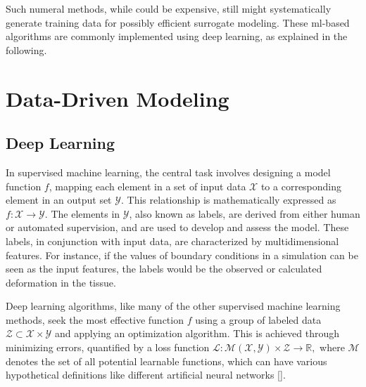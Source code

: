 Such numeral methods, while could be expensive, still might systematically generate training data for possibly efficient surrogate modeling. These \ac{ml}-based algorithms are commonly implemented using deep learning, as explained in the following.

\section{Data-Driven Modeling}
\subsection{Deep Learning}

In supervised machine learning, the central task involves designing a model function $f$, mapping each element in a set of input data $\mathcal{X}$ to a corresponding element in an output set $\mathcal{Y}$. This relationship is mathematically expressed as $f: \mathcal{X} \longrightarrow \mathcal{Y}.$ The elements in $\mathcal{Y}$, also known as labels, are derived from either human or automated supervision, and are used to develop and assess the model. These labels, in conjunction with input data, are characterized by multidimensional features. For instance, if the values of boundary conditions in a simulation can be seen as the input features, the labels would be the observed or calculated deformation in the tissue.

Deep learning algorithms, like many of the other supervised machine learning methods, seek the most effective function $f$ using a group of labeled data $\mathcal{Z}\subset \mathcal{X} \times \mathcal{Y}$ and applying an optimization algorithm. This is achieved through minimizing errors, quantified by a loss function $\mathcal{L}: \mathcal{M} \left ( \mathcal{X},\mathcal{Y} \right ) \times \mathcal{Z} \longrightarrow \mathbb{R},$ where $\mathcal{M}$ denotes the set of all potential learnable functions, which can have various hypothetical definitions like different artificial neural networks [\cite{abiodun2019}].

